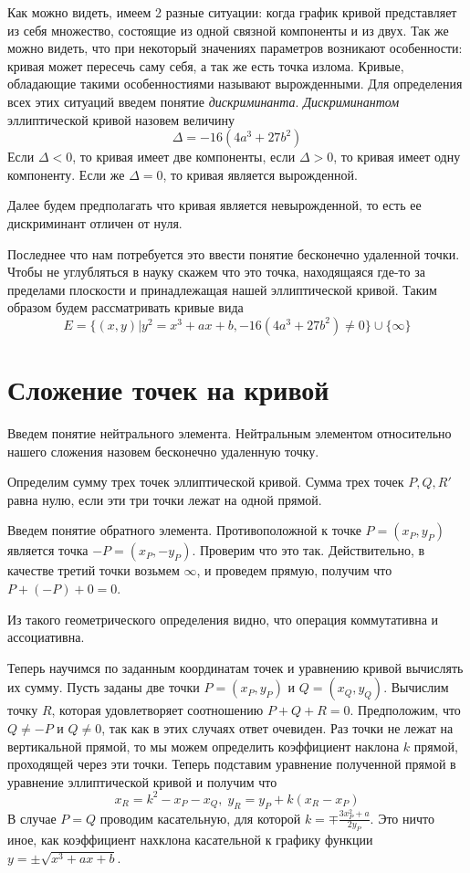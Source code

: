 \documentclass[a4paper,12pt]{article}
\begin{document}
        Как можно видеть, имеем 2 разные ситуации: когда график кривой представляет из себя множество, состоящие из одной связной 
        компоненты и из двух. Так же можно видеть, что при некоторый значениях параметров возникают особенности: кривая может пересечь саму себя,
        а так же есть точка излома. Кривые, обладающие такими особенностиями называют вырожденными. Для определения всех этих ситуаций введем
        понятие \textit{дискриминанта}. \textit{Дискриминантом} эллиптической кривой назовем величину 
        $$
            \Delta = -16(4a^3 + 27b^2)
        $$ 
        Если $\Delta < 0$, то кривая имеет две компоненты, если $\Delta > 0$, то кривая имеет одну компоненту. Если же
        $\Delta = 0$, то кривая является вырожденной.

        Далее будем предполагать что кривая является невырожденной, то есть ее дискриминант отличен от нуля. 

        Последнее что нам потребуется это ввести понятие бесконечно удаленной точки. Чтобы не углубляться в науку скажем что это точка, находящаяся где-то
        за пределами плоскости и принадлежащая нашей эллиптической кривой. Таким образом будем рассматривать кривые вида
        $$
            E = \{(x, y) | y^2 = x^3 + ax + b, -16(4a^3 + 27b^2) \neq 0\} \cup \{\infty\}
        $$

    \section{Сложение точек на кривой}
        Введем понятие нейтрального элемента. Нейтральным элементом относительно нашего сложения назовем бесконечно удаленную точку.

        Определим сумму трех точек эллиптической кривой. Сумма трех точек $P, Q, R'$ равна нулю, если эти три точки лежат
        на одной прямой. 

        Введем понятие обратного элемента. Противоположной к точке $P = (x_P, y_P)$ является точка $-P = (x_P, -y_P)$. Проверим что это так.
        Действительно, в качестве третий точки возьмем $\infty$, и проведем прямую, получим что $P + (-P) + 0 = 0$. 

        Из такого геометрического определения видно, что операция коммутативна и ассоциативна. 

        Теперь научимся по заданным координатам точек и уравнению кривой вычислять их сумму. Пусть заданы две точки $P = (x_P, y_P)$ и
        $Q = (x_Q, y_Q)$. Вычислим точку $R$, которая удовлетворяет соотношению $P + Q + R = 0$. Предположим, что $Q \neq -P$ и $Q \neq 0$,
        так как в этих случаях ответ очевиден. Раз точки не лежат на вертикальной прямой, то мы можем определить коэффициент наклона $k$ прямой,
        проходящей через эти точки. Теперь подставим уравнение полученной прямой в уравнение эллиптической кривой и получим что
        $$
            x_R = k^2 - x_P - x_Q,\;
            y_R = y_P + k(x_R - x_P)
        $$
        В случае $P = Q$ проводим касательную, для которой $k = \mp\frac{3x_P^2 + a}{2y_P}$. Это ничто иное, как коэффициент нахклона
        касательной к графику функции $y = \pm\sqrt{x^3 + ax + b}$.
\end{document}
